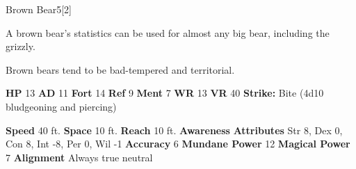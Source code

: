   \begin{monsubsection}{Brown Bear}{5}[2]
    \vspace{-1em}\vspace{-1em}
    \vspace{0em}

    
          A brown bear's statistics can be used for almost any big bear, including the grizzly.
        
            Brown bears tend to be bad-tempered and territorial.
          

    \begin{spellcontent}
      \begin{spelltargetinginfo}
        \pari \textbf{HP} 13 \monsep
          \textbf{AD} 11 \monsep
          \textbf{Fort} 14 \monsep
          \textbf{Ref} 9 \monsep
          \textbf{Ment} 7
        \pari \textbf{WR} 13 \monsep
        \textbf{VR} 40
        \pari \textbf{Strike:}
            Bite  (4d10 bludgeoning and piercing)
      \end{spelltargetinginfo}
    \end{spellcontent}
    \begin{monsterfooter}
      \pari \textbf{Speed} 40 ft. \monsep
        \textbf{Space} 10 ft. \monsep
        \textbf{Reach} 10 ft.
      \pari \textbf{Awareness} 
      \pari \textbf{Attributes}
        Str 8, Dex 0,
        Con 8, Int -8,
        Per 0, Wil -1
      \pari \textbf{Accuracy} 6 \monsep
        \textbf{Mundane Power} 12 \monsep
      \textbf{Magical Power} 7
      \pari \textbf{Alignment} Always true neutral
    \end{monsterfooter}
  \end{monsubsection}
  
  
  
